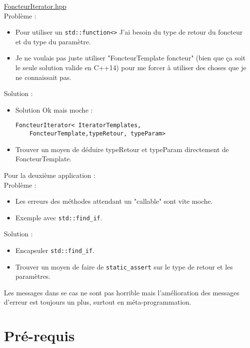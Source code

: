 \documentclass{beamer}
\begin{document}
\begin{frame}[containsverbatim]
	\href{run:../code/src/iterateurFoncteur.hpp}{FoncteurIterator.hpp}\\
	Problème : 
	\begin{itemize}
		\item Pour utiliser un \lstinline{std::function<>} J'ai besoin du type de retour du foncteur et du type du paramètre. 
		\item Je ne voulais pas juste utiliser "FoncteurTemplate foncteur" (bien que ça soit le seule solution valide en C++14) pour me forcer à utiliser des choses que je ne connaissait pas.
	\end{itemize}
	Solution :
	\begin{itemize}
		\item Solution Ok mais moche : 
	\begin{lstlisting}
FoncteurIterator< IteratorTemplates,
    FoncteurTemplate,typeRetour, typeParam>
	\end{lstlisting}		
		\item Trouver un moyen de déduire typeRetour et typeParam directement de FoncteurTemplate. 
	\end{itemize}
\end{frame}

\begin{frame}
	Pour la deuxième application :  
\\
		Problème : 
	\begin{itemize}
		\item Les erreurs des méthodes attendant un "callable" sont vite moche.
		\item Exemple avec \lstinline{std::find_if}.
	\end{itemize}
	Solution :
	\begin{itemize}
		\item Encapsuler \lstinline{std::find_if}.
		\item Trouver un moyen de faire de \lstinline{static_assert} sur le type de retour et les paramètres. 
	\end{itemize}
	
	Les messages dans se cas ne sont pas horrible mais l’amélioration des messages d'erreur est toujours un plus, surtout en méta-programmation.
\end{frame}

\section{Pré-requis}
\end{document}
